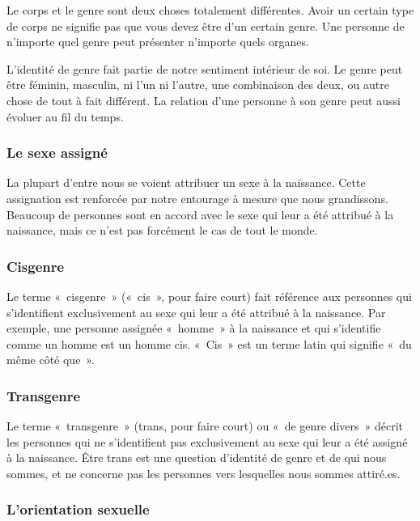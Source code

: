 \documentclass[12pt,openany]{book}
\begin{document}
\noindent Le corps et le genre sont deux choses totalement différentes. Avoir un certain type de corps ne signifie pas que vous devez être d’un certain genre. Une personne de n’importe quel genre peut présenter n’importe quels organes.

L’identité de genre fait partie de notre sentiment intérieur de soi. Le genre peut être féminin, masculin, ni l’un ni l’autre, une combinaison des deux, ou autre chose de tout à fait différent. La relation d’une personne à son genre peut aussi évoluer au fil du temps.

\subsubsection*{Le sexe assigné}

\noindent La plupart d’entre nous se voient attribuer un sexe à la naissance. Cette assignation est renforcée par notre entourage à mesure que nous grandissons. Beaucoup de personnes sont en accord avec le sexe qui leur a été attribué à la naissance, mais ce n’est pas forcément le cas de tout le monde.

\subsubsection*{Cisgenre}

\noindent Le terme \mbox{« cisgenre »} (\mbox{« cis »}, pour faire court) fait référence aux personnes qui s’identifient exclusivement au sexe qui leur a été attribué à la naissance. Par exemple, une personne assignée \mbox{« homme »} à la naissance et qui s’identifie comme un homme est un homme cis.
\mbox{« Cis »} est un terme latin qui signifie \mbox{« d}u même côté qu\mbox{e »}.

\subsubsection*{Transgenre} 

\noindent Le terme \mbox{« transgenre »} (trans, pour faire court) ou \mbox{« d}e genre diver\mbox{s »} décrit les personnes qui ne s’identifient pas exclusivement au sexe qui leur a été assigné à la naissance. Être trans est une question d’identité de genre et de qui nous sommes, et ne concerne pas les personnes vers lesquelles nous sommes attiré.es.

\subsubsection*{L’orientation sexuelle} 
\end{document}
